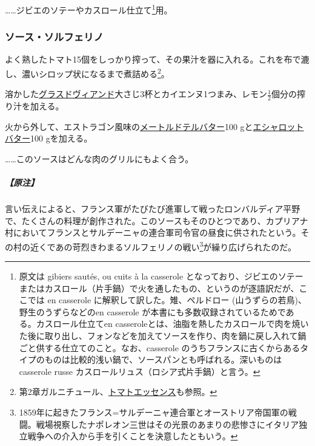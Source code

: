 \begin{recette}
\ldots{}\ldots{}ジビエのソテーやカスロール仕立て\footnote{原文は gibiers
  sautés, ou cuits à la casserole
  となっており、ジビエのソテーまたはカスロール（片手鍋）で火を通したもの、というのが逐語訳だが、ここでは
  en casserole に解釈して訳した。雉、ペルドロー
  (山うずらの若鳥)、野生のうずらなどのen casserole
  が本書にも多数収録されているためである。カスロール仕立てen
  casseroleとは、油脂を熱したカスロールで肉を焼いた後に取り出し、フォンなどを加えてソースを作り、肉を鍋に戻し入れて鍋ごと供する仕立てのこと。なお、casserole
  のうちフランスに古くからあるタイプのものは比較的浅い鍋で、ソースパンとも呼ばれる。深いものはcasserole
  russe カスロールリュス（ロシア式片手鍋）と言う。}用。

\atoaki{}

\hypertarget{sauce-solferino}{%
\subsubsection{ソース・ソルフェリノ}\label{sauce-solferino}}


 

よく熟したトマト15個をしっかり搾って、その果汁を器に入れる。これを布で漉し、濃いシロップ状になるまで煮詰める\footnote{第2章ガルニチュール、\protect\hyperlink{essence-de-tomate}{トマトエッセンス}も参照。}。

溶かした\protect\hyperlink{glace-de-viande}{グラスドヴィアンド}大さじ3杯とカイエンヌ1つまみ、レモン\(\frac{1}{2}\)個分の搾り汁を加える。

火から外して、エストラゴン風味の\protect\hyperlink{beurre-maitre-d-hotel}{メートルドテルバター}100
gと\protect\hyperlink{beurre-d-echalote}{エシャロットバター}100
gを加える。

\ldots{}\ldots{}このソースはどんな肉のグリルにもよく合う。

\hypertarget{nota-sauce-solferino}{%
\subparagraph{【原注】}\label{nota-sauce-solferino}}

言い伝えによると、フランス軍がたびたび進軍して戦ったロンバルディア平野で、たくさんの料理が創作された。このソースもそのひとつであり、カプリアナ村においてフランスとサルデーニャの連合軍司令官の昼食に供されたという。その村の近くであの苛烈きわまるソルフェリノの戦い\footnote{1859年に起きたフランス=サルデーニャ連合軍とオーストリア帝国軍の戦闘。戦場視察したナポレオン三世はその光景のあまりの悲惨さにイタリア独立戦争への介入から手を引くことを決意したともいう。}が繰り広げられたのだ。


\end{recette}
